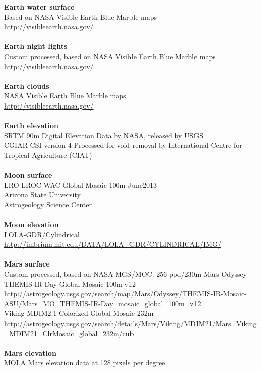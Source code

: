 \documentclass[Orbiter User Manual.tex]{subfiles}
\begin{document}
\textbf{Earth water surface}\\
Based on NASA Visible Earth Blue Marble maps\\
\url{http://visibleearth.nasa.gov/}\\
\\
\textbf{Earth night lights}\\
Custom processed, based on NASA Visible Earth Blue Marble maps\\
\url{http://visibleearth.nasa.gov/}\\
\\
\textbf{Earth clouds}\\
NASA Visible Earth Blue Marble maps\\
\url{http://visibleearth.nasa.gov/}\\
\\
\textbf{Earth elevation}\\
SRTM 90m Digital Elevation Data by NASA, released by USGS\\
CGIAR-CSI version 4 Processed for void removal by International Centre for Tropical Agriculture (CIAT)\\
\\
\textbf{Moon surface}\\
LRO LROC-WAC Global Mosaic 100m June2013\\
Arizona State University\\
Astrogeology Science Center\\
\\
\textbf{Moon elevation}\\
LOLA-GDR/Cylindrical\\
\url{http://imbrium.mit.edu/DATA/LOLA_GDR/CYLINDRICAL/IMG/}\\
\\
\textbf{Mars surface}\\
Custom processed, based on NASA MGS/MOC. 256 ppd/230m Mars Odyssey THEMIS-IR Day Global Mosaic 100m v12\\
\url{http://astrogeology.usgs.gov/search/map/Mars/Odyssey/THEMIS-IR-Mosaic-ASU/Mars_MO_THEMIS-IR-Day_mosaic_global_100m_v12}\\
Viking MDIM2.1 Colorized Global Mosaic 232m\\
\url{http://astrogeology.usgs.gov/search/details/Mars/Viking/MDIM21/Mars_Viking_MDIM21_ClrMosaic_global_232m/cub}\\
\\
\textbf{Mars elevation}\\
MOLA Mars elevation data at 128 pixels per degree\\
\end{document}

